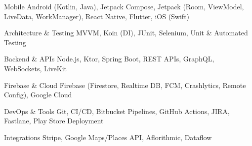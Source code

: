 

\begin{cvskills}

  \cvskill
    {Mobile} %
    {Android (Kotlin, Java), Jetpack Compose, Jetpack (Room, ViewModel, LiveData, WorkManager), React Native, Flutter, iOS (Swift)} %

  \cvskill
    {Architecture \& Testing} %
    {MVVM, Koin (DI), JUnit, Selenium, Unit \& Automated Testing} %

  \cvskill
    {Backend \& APIs} %
    {Node.js, Ktor, Spring Boot, REST APIs, GraphQL, WebSockets, LiveKit} %

  \cvskill
    {Firebase \& Cloud} %
    {Firebase (Firestore, Realtime DB, FCM, Crashlytics, Remote Config), Google Cloud} %

  \cvskill
    {DevOps \& Tools} %
    {Git, CI/CD, Bitbucket Pipelines, GitHub Actions, JIRA, Fastlane, Play Store Deployment} %

  \cvskill
    {Integrations} %
    {Stripe, Google Maps/Places API, Aflorithmic, Dataflow} %

\end{cvskills}